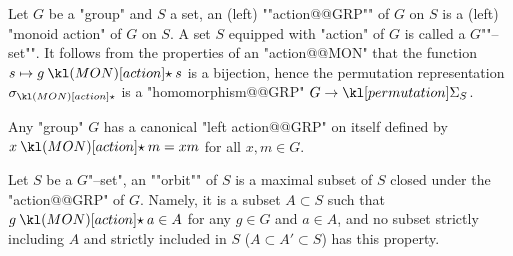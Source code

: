 \documentclass[main.tex]{subfiles}
\begin{document}
\begin{defn}
    Let $G$ be a "group" and $S$ a set, \AP an (left) ""action@@GRP"" of $G$ on $S$ is a (left) "monoid action" of $G$ on $S$. \AP A set $S$ equipped with "action" of $G$ is called a $G$""--set"". It follows from the properties of an "action@@MON" that the function $s \mapsto g\actmon s$ is a bijection, hence the permutation representation $\sigma_{\actmon}$ is a "homomorphism@@GRP" $G \rightarrow \Perm_S$.
\end{defn}
\begin{exmp}
    Any "group" $G$ has a canonical "left action@@GRP" on itself defined by $x \actmon m = xm$ for all $x,m\in G$.
\end{exmp}
\begin{defn}[Orbit]
	\AP Let $S$ be a $G$"--set", an ""orbit"" of $S$ is a maximal subset of $S$ closed under the "action@@GRP" of $G$. Namely, it is a subset $A \subset S$ such that $g \actmon a \in A$ for any $g \in G$ and $a \in A$, and no subset strictly including $A$ and strictly included in $S$ ($A \subset A' \subset S$) has this property.
\end{defn}
\end{document}
